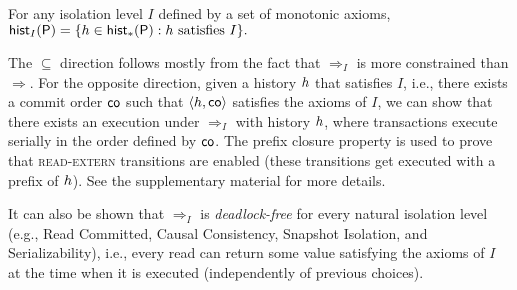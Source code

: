  \begin{theorem}
For any isolation level $I$ defined by a set of monotonic axioms,
$
\histOf[I]{\prog} = \{ h \in \histOf[*]{\prog}: h\mbox{ satisfies }I\}.
$
 \end{theorem}
 
The $\subseteq$ direction follows mostly from the fact that $\Rightarrow_I$ is more constrained than $\Rightarrow$. For the opposite direction, given a history $\hist$ that satisfies $I$, i.e., there exists a commit order $\co$ such that $\tup{h,\co}$ satisfies the axioms of $I$, we can show that there exists an execution under $\Rightarrow_I$ with history $\hist$, where transactions  execute serially in the order defined by $\co$. The prefix closure property is used to prove that \textsc{read-extern} transitions are enabled (these transitions get executed with a prefix of $\hist$). See the supplementary material for more details.
  
It can also be shown that $\Rightarrow_I$ is \emph{deadlock-free} for every natural isolation level (e.g., Read Committed, Causal Consistency, Snapshot Isolation, and Serializability), i.e., every read can return some value satisfying the axioms of $I$ at the time when it is executed (independently of previous choices). 

 
 
